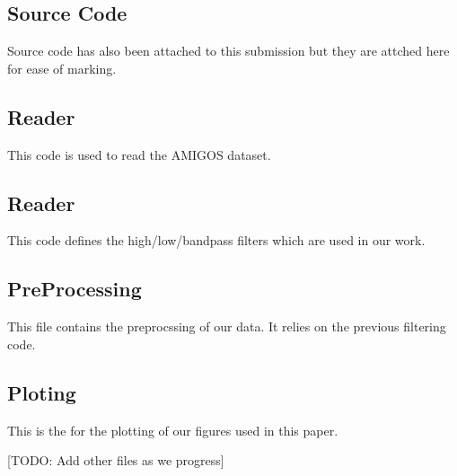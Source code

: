 \clearpage
\onecolumn
\appendix
\begin{appendices}
  \section{Source Code}
  Source code has also been attached to this submission
  but they are attched here for ease of marking.

  \subsection{Reader}
  This code is used to read the AMIGOS dataset.
  

  \subsection{Reader}
  This code defines the high/low/bandpass filters
  which are used in our work.
  

  \subsection{PreProcessing}
  This file contains the preprocssing of our data.
  It relies on the previous filtering code.
  

  \subsection{Ploting}
  This is the for the plotting of our figures used in this paper.
  

  [TODO: Add other files as we progress]
\end{appendices}

